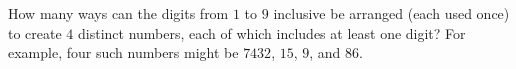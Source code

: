 How many ways can the digits from $1$ to $9$ inclusive be arranged (each used once) to create $4$ distinct numbers, each of which includes at least one digit? For example, four such numbers might be $7432$, $15$, $9$, and $86$.
